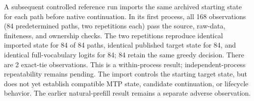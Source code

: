 A subsequent controlled reference run imports the same archived starting state
for each path before native continuation. In its first process, all 168
observations (84 predetermined paths, two repetitions each) pass the source,
raw-data, finiteness, and ownership checks. The two repetitions reproduce
identical imported state for 84 of 84 paths, identical published target
state for 84, and identical full-vocabulary logits for
84; 84 retain the same greedy decision.
There are 2 exact-tie observations. This is a within-process result;
independent-process repeatability remains pending. The import controls the
starting target state, but does not yet establish compatible MTP state,
candidate continuation, or lifecycle behavior. The earlier natural-prefill
result remains a separate adverse observation.
